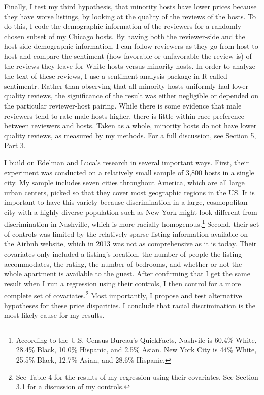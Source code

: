\documentclass[11pt, oneside]{article}
\begin{document}
Finally, I test my third hypothesis, that minority hosts have lower prices because they have worse listings, by looking at the quality of the reviews of the hosts. To do this, I code the demographic information of the reviewers for a randomly-chosen subset of my Chicago hosts. By having both the reviewer-side and the host-side demographic information, I can follow reviewers as they go from host to host and compare the sentiment (how favorable or unfavorable the review is) of the reviews they leave for White hosts versus minority hosts. In order to analyze the text of these reviews, I use a sentiment-analysis package in R called sentimentr.\cite{sentimentr} Rather than observing that all minority hosts uniformly had lower quality reviews, the significance of the result was either negligible or depended on the particular reviewer-host pairing. While there is some evidence that male reviewers tend to rate male hosts higher, there is little within-race preference between reviewers and hosts. Taken as a whole, minority hosts do not have lower quality reviews, as measured by my methods. For a full discussion, see Section 5, Part 3. 

I build on Edelman and Luca's research in several important ways. First, their experiment was conducted on a relatively small sample of 3,800 hosts in a single city. My sample includes seven cities throughout America, which are all large urban centers, picked so that they cover most geographic regions in the US. It is important to have this variety because discrimination in a large, cosmopolitan city with a highly diverse population such as New York might look different from discrimination in Nashville, which is more racially homogenous.\footnote{According to the U.S. Census Bureau's QuickFacts, Nashvile is 60.4\% White, 28.4\% Black, 10.0\% Hispanic, and 2.5\% Asian. New York City is 44\% White, 25.5\% Black, 12.7\% Asian, and 28.6\% Hispanic.} Second, their set of controls was limited by the relatively sparse listing information available on the Airbnb website, which in 2013 was not as comprehensive as it is today. Their covariates only included a listing's location, the number of people the listing accommodates, the rating, the number of bedrooms, and whether or not the whole apartment is available to the guest. After confirming that I get the same result when I run a regression using their controls, I then control for a more complete set of covariates.\footnote{See Table 4 for the results of my regression using their covariates. See Section 3.1 for a discussion of my controls.} Most importantly, I propose and test alternative hypotheses for these price disparities. I conclude that racial discrimination is the most likely cause for my results. 
\end{document}

